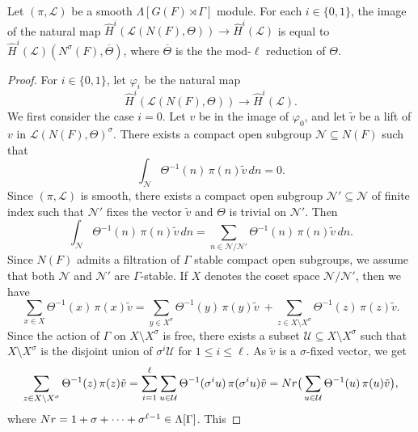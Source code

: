 \documentclass[10pt,a4paper]{amsart}
\begin{document}
\begin{lemma}\label{Tate_image}
Let $(\pi,\mathcal{L})$ be a smooth
$\Lambda[G(F)\rtimes \Gamma]$ module.
For each $i\in\{0,1\}$, the image of the natural map
$\widehat{H}^i(\mathcal{L}(N(F), \Theta))\rightarrow
\widehat{H}^i(\mathcal{L})$ is equal to
 $\widehat{H}^i(\mathcal{L}) (N^\sigma(F),\overline{\Theta})$, where
 $\overline{\Theta}$ is the the mod-$\ell$ reduction of $\Theta$.
\end{lemma}

\begin{proof}
For $i\in\{0,1\}$, let $\varphi_i$ be the natural map
$$ \widehat{H}^i(\mathcal{L}(N(F),
\Theta))\longrightarrow \widehat{H}^i(\mathcal{L}). $$ We first
consider the case $i=0$. Let $v$ be in the image of $\varphi_0$, and
let $\tilde{v}$ be a lift of $v$ in $\mathcal{L}(N(F),\Theta)^\sigma$.
There exists a compact open subgroup $\mathcal{N}\subseteq N(F)$ such
that
\begin{equation}\label{lift_sum_1}
\int_{\mathcal{N}}\Theta^{-1}(n)\,\pi(n)\tilde{v}\,dn = 0.
\end{equation}
Since $(\pi,\mathcal{L})$ is smooth, there exists a compact open
subgroup $\mathcal{N}'\subseteq \mathcal{N}$ of finite index such that
$\mathcal{N'}$ fixes the vector $\tilde{v}$ and $\Theta$ is trivial on
$\mathcal{N}'$. Then
$$ \int_{\mathcal{N}}\Theta^{-1}(n)\,
\pi(n)\tilde{v}\,dn = \sum_{n\in \mathcal{N}/\mathcal{N}'}
\Theta^{-1}(n)\,\pi(n)\tilde{v}\,dn. $$ Since $N(F)$ admits a
filtration of $\Gamma$ stable compact open subgroups, we
assume that both $\mathcal{N}$ and $\mathcal{N}'$ are $\Gamma$-stable. If $X$
denotes the coset space $\mathcal{N} /\mathcal{N}'$, then we have
\begin{equation}\label{sum_lift_2}
\sum_{x\in X} \Theta^{-1}(x)\,\pi(x)\tilde{v} =
\sum_{y\in X^\sigma} \Theta^{-1}(y)\,\pi(y)\tilde{v}\ +
\sum_{z\in {X\setminus X^\sigma}} \Theta^{-1}(z)\,\pi(z)\tilde{v}.
\end{equation}
Since the action of $\Gamma$ on $X\setminus X^\sigma$ is
free, there exists a subset $\mathcal{U}\subseteq X\setminus X^\sigma$
such that $X\setminus X^\sigma$ is the disjoint union of
$\sigma^i\mathcal{U}$ for $1\leq i\leq\ell$. As $\tilde{v}$ is a
$\sigma$-fixed vector, we get
$$ \sum_{z\in {X\setminus X^\sigma}} \Theta^{-1}(z)\,\pi(z)\tilde{v} =
\sum_{i=1}^\ell\sum_{u\in \mathcal{U}}\Theta^{-1}(\sigma^iu)\,
\pi(\sigma^iu)\tilde{v} = {\rm Nr}\big(\sum_{u\in \mathcal{U}}
\Theta^{-1}(u)\,\pi(u)\tilde{v}\big), $$ where
${\rm Nr} = 1+\sigma+\cdots +\sigma^{\ell-1}\in \Lambda[\Gamma]$. This

\end{proof}
\end{document}
